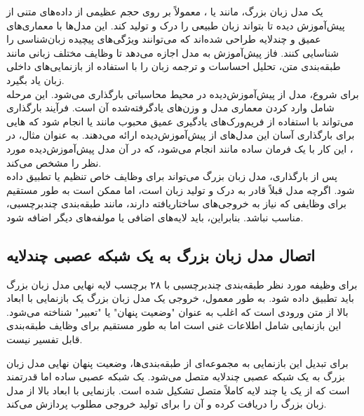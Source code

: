 یک مدل زبان بزرگ، مانند  یا ، معمولاً بر روی حجم عظیمی از داده‌های متنی از پیش‌آموزش دیده تا بتواند زبان طبیعی را درک و تولید کند. این مدل‌ها با معماری‌های عمیق و چندلایه طراحی شده‌اند که می‌توانند ویژگی‌های پیچیده زبان‌شناسی را شناسایی کنند. فاز پیش‌آموزش به مدل اجازه می‌دهد تا وظایف مختلف زبانی مانند طبقه‌بندی متن، تحلیل احساسات و ترجمه زبان را با استفاده از بازنمایی‌های داخلی زبان یاد بگیرد.
\\
برای شروع، مدل از پیش‌آموزش‌دیده در محیط محاسباتی بارگذاری می‌شود. این مرحله شامل وارد کردن معماری مدل و وزن‌های یادگرفته‌شده آن است. فرآیند بارگذاری می‌تواند با استفاده از فریم‌ورک‌های یادگیری عمیق محبوب مانند  یا  انجام شود که  هایی برای بارگذاری آسان این مدل‌های از پیش‌آموزش‌دیده ارائه می‌دهند.
به عنوان مثال، در ، این کار با یک فرمان ساده مانند  انجام می‌شود، که در آن  مدل پیش‌آموزش‌دیده مورد نظر را مشخص می‌کند.
\\
پس از بارگذاری، مدل زبان بزرگ می‌تواند برای وظایف خاص تنظیم یا تطبیق داده شود. اگرچه مدل قبلاً قادر به درک و تولید زبان است، اما ممکن است به طور مستقیم برای وظایفی که نیاز به خروجی‌های ساختاریافته دارند، مانند طبقه‌بندی چند‌برچسبی، مناسب نباشد. بنابراین، باید لایه‌های اضافی یا مولفه‌های دیگر اضافه شود.
\subsection{اتصال مدل زبان بزرگ به یک شبکه عصبی چندلایه }

برای وظیفه مورد نظر طبقه‌بندی چند‌برچسبی با ۲۸ برچسب لایه نهایی مدل زبان بزرگ باید تطبیق داده شود. به طور معمول، خروجی یک مدل زبان بزرگ یک بازنمایی با ابعاد بالا از متن ورودی است که اغلب به عنوان "وضعیت پنهان" یا "تعبیر" شناخته می‌شود. این بازنمایی شامل اطلاعات غنی است اما به طور مستقیم برای وظایف طبقه‌بندی قابل تفسیر نیست.

برای تبدیل این بازنمایی به مجموعه‌ای از طبقه‌بندی‌ها، وضعیت پنهان نهایی مدل زبان بزرگ به یک شبکه عصبی چندلایه  متصل می‌شود.  یک شبکه عصبی ساده اما قدرتمند است که از یک یا چند لایه کاملاً متصل تشکیل شده است.  بازنمایی با ابعاد بالا از مدل زبان بزرگ را دریافت کرده و آن را برای تولید خروجی مطلوب پردازش می‌کند.

